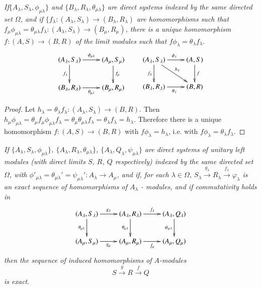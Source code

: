 \textit{If\pageoriginale $\{ A_\lambda, S_\lambda, \phi_{\mu\lambda}\}$ and $\{
  B_\lambda, R_\lambda, \theta_{\mu\lambda}\}$ are direct systems
  indexed by the same directed set $\Omega$, and if $\{f_\lambda :
  (A_\lambda, S_\lambda) \rightarrow (B_\lambda, R_\lambda)$ are
  homomorphisms such that $f_\mu \phi_{\mu\lambda} =
  \theta_{\mu\lambda} f_\lambda : (A_\lambda, S_\lambda) \rightarrow
  (B_\mu, R_\mu)$, there is a unique homomorphism $f : (A,S)
  \rightarrow (B,R)$ of the limit modules such that $f \phi_\lambda =
  \theta_\lambda f_\lambda$}.  
\[
\xymatrix{
(A_{\lambda}, S_{\lambda})\ar[d]_{f_{\lambda}} \ar[r]^{\phi_{\mu\lambda}} &
  (A_{\mu},S_{\mu}) \ar[d]^{f_{\mu}}\\
(B_{\lambda}, R_{\lambda}) \ar[r]_{\theta_{\mu\lambda}} & (B_{\mu}, R_{\mu})
}
\qquad 
\xymatrix{
(A_{\lambda}, S_{\lambda}) \ar[d]_{f_{\lambda}}
  \ar[r]^{\phi_{\lambda}}\ar[dr]^{h_{\lambda}} & (A,S)\ar[d]^f\\
(B_{\lambda}, R_{\lambda}) \ar[r]_{\theta_{\lambda}} & (B,R)
}
\]

\begin{proof}
Let $h_\lambda = \theta_\lambda f_\lambda : (A_\lambda, S_\lambda)
\rightarrow (B,R)$. Then $h_\mu \phi_{\mu\lambda} = \theta_\mu f_\mu
\phi_{\mu\lambda} f_\lambda = \theta_\mu \theta_{\mu \lambda}
f_\lambda = \theta_\lambda f_\lambda = h_\lambda$. Therefore there is
a unique homomorphism $ f : (A,S) \rightarrow (B,R)$ with $f
\phi_\lambda = h_\lambda$, i.e. with $f \phi_\lambda = \theta_\lambda
f_\lambda$. 
\end{proof}

\textit{If $\{A_\lambda, S_\lambda, \phi_{\mu\lambda} \}$, $\{A_\lambda,
  R_\lambda, \theta_{\mu\lambda} \}$, $\{A_\lambda, Q_\lambda,
  \psi_{\mu\lambda} \}$ are direct systems of unitary left modules
  (with direct limits $S$, $R$, $Q$ respectively) indexed by the same
  directed set $\Omega$, with $\phi'_{\mu\lambda}
  =\theta_{\mu\lambda}' = \psi_{\mu\lambda}' : A_\lambda \rightarrow
  A_\mu $, and if, for each $\lambda \in \Omega$, $S_\lambda
  \xrightarrow{g_\lambda} R_\lambda \xrightarrow{f_\lambda} \varphi_\lambda$
  is an exact sequence of homomorphisms of $A_\lambda$ - modules, and
  if commutativity holds in} 
\[
\xymatrix{
(A_\lambda, S_\lambda)\ar[r]^{g_{\lambda}} \ar[d]_{\theta_{\mu\lambda}}
& (A_\lambda, R_\lambda) \ar[d]_{\theta_{\mu\lambda}}
\ar[r]^{f_{\lambda}}& (A_{\lambda}, Q_{\lambda})
\ar[d]_{\psi_{\mu\lambda}}\\
(A_\mu, S_\mu) \ar[r]_{g_{\mu}} & (A_{\mu}, R_{\mu}) \ar[r]_{f_{\mu}}
& (A_{\mu}, Q_{\mu})
}
\]
\noindent
\textit{then the sequence of induced homomorphisms of $A$-modules}
$$
S \xrightarrow{g} R \xrightarrow{f} Q
$$
\textit{is exact}.\pageoriginale

